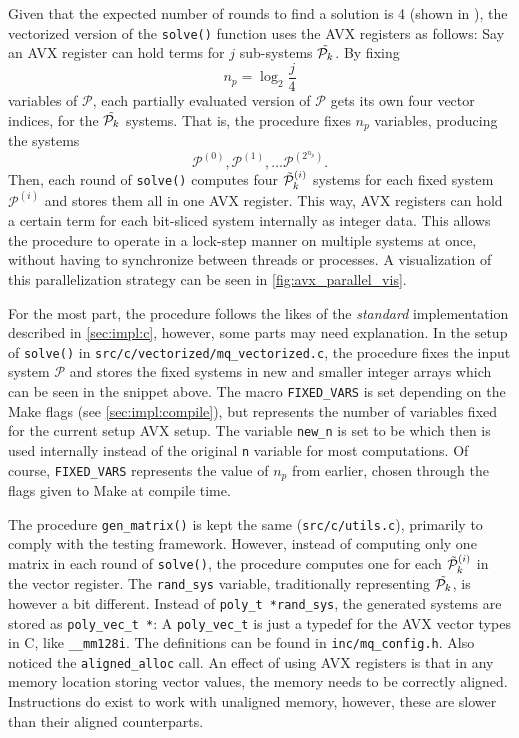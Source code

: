 Given that the expected number of rounds to find a solution is 4 (shown in \cite{eurocrypt-2021-30841}), the vectorized version of the \texttt{solve()} function uses the AVX registers as follows: Say an AVX register can hold terms for $j$ sub-systems $\Tilde{\mathcal{P}_k}$. By fixing 
$$
    n_p = \log_2 \frac{j}{4}
$$ 
variables of $\mathcal{P}$, each partially evaluated version of $\mathcal{P}$ gets its own four vector indices, for the $\Tilde{\mathcal{P}_k}$ systems. That is, the procedure fixes $n_p$ variables, producing the systems
$$
    \mathcal{P}^{(0)}, \mathcal{P}^{(1)}, \dots \mathcal{P}^{(2^{n_{p}})}.
$$
Then, each round of \texttt{solve()} computes four $\Tilde{\mathcal{P}}^{(i)}_k$ systems for each fixed system $\mathcal{P}^{(i)}$ and stores them all in one AVX register. This way, AVX registers can hold a certain term for each bit-sliced system internally as integer data. This allows the procedure to operate in a lock-step manner on multiple systems at once, without having to synchronize between threads or processes. A visualization of this parallelization strategy can be seen in \cref{fig:avx_parallel_vis}.

For the most part, the procedure follows the likes of the \textit{standard} implementation described in \cref{sec:impl:c}, however, some parts may need explanation. In the setup of \texttt{solve()} in \texttt{src/c/vectorized/mq\_vectorized.c}, the procedure fixes the input system $\mathcal{P}$ and stores the fixed systems in new and smaller integer arrays
which can be seen in the snippet above. The macro \texttt{FIXED\_VARS} is set depending on the Make flags (see \cref{sec:impl:compile}), but represents the number of variables fixed for the current setup AVX setup. The variable \texttt{new\_n} is set to be 
which then is used internally instead of the original \texttt{n} variable for most computations. Of course, \texttt{FIXED\_VARS} represents the value of $n_p$ from earlier, chosen through the flags given to Make at compile time.

The procedure \texttt{gen\_matrix()} is kept the same (\texttt{src/c/utils.c}), primarily to comply with the testing framework. However, instead of computing only one matrix in each round of \texttt{solve()}, the procedure computes one for each $\Tilde{\mathcal{P}}^{(i)}_k$ in the vector register. The \texttt{rand\_sys} variable, traditionally representing $\Tilde{\mathcal{P}_k}$, is however a bit different. Instead of \texttt{poly\_t *rand\_sys}, the generated systems are stored as \texttt{poly\_vec\_t *}:
A \texttt{poly\_vec\_t} is just a typedef for the AVX vector types in C, like \texttt{\_\_mm128i}. The definitions can be found in \texttt{inc/mq\_config.h}. Also noticed the \texttt{aligned\_alloc} call. An effect of using AVX registers is that in any memory location storing vector values, the memory needs to be correctly aligned. Instructions do exist to work with unaligned memory, however, these are slower than their aligned counterparts.


